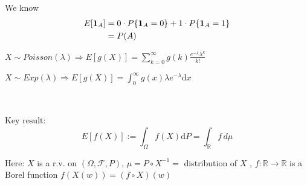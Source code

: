 \documentclass[11pt]{article}
\begin{document}
We know 
\begin{align*}
    E[\bm{1}_{A}] &= 0 \cdot P\{\bm{1}_{A} = 0\} + 1 \cdot  P\{\bm{1}_{A} = 1\}\\
    &= P(A)
\end{align*}

\begin{example}
    \item $X \sim Poisson(\lambda) \Longrightarrow E[g(X)] = \sum_{k=0}^{\infty} g(k) 
    \frac{e^{-\lambda}\lambda^k}{k!}$
    \item $X \sim  Exp(\lambda) \Longrightarrow E[g(X)] = \int_{0}^{\infty} g(x) \lambda 
    e^{-\lambda } \mathrm{d}x$
\end{example}


\begin{theorem}
    \,

    $\underline{\text{Key result}}$: 
    $$E[f(X)] := \int_{\Omega}f(X)  \mathrm{d}P = \int_{\mathbb{R}}f \, d \mu$$

    Here: $X$ is a r.v. on $(\Omega, \mathcal{F}, P)$, $\mu = P \circ X^{-1}=$ distribution of $X$ ,
    $f: \mathbb{R} \to \mathbb{R}$ is a Borel function $f(X(w)) = (f \circ X)(w)$
\end{theorem}
\end{document}
